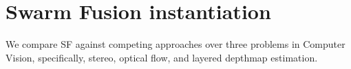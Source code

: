 \section{Swarm Fusion instantiation}

We compare SF against competing approaches over three problems in
Computer Vision, specifically, stereo, optical flow, and layered
depthmap estimation.



